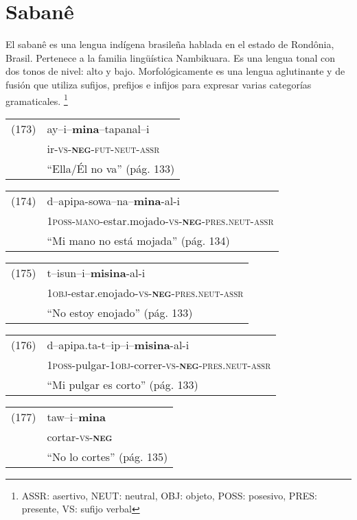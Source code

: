 \section*{Sabanê}

\noindent El sabanê es una lengua indígena brasileña hablada en el estado de Rondônia, Brasil. Pertenece a la familia lingüística Nambikuara. Es una lengua tonal con dos tonos de nivel: alto y bajo. Morfológicamente es una lengua aglutinante y de fusión que utiliza sufijos, prefijos e infijos para expresar varias categorías gramaticales.
\footnote{ASSR: asertivo, NEUT: neutral, OBJ: objeto, POSS: posesivo, PRES: presente, VS: sufijo verbal}
\vspace{0.5cm}

{\setmainfont{Charis SIL} 

\begin{tabular}{ll}
(173) & ay–i–\textbf{mina}–tapanal–i \\
& ir-\textsc{vs-\textbf{neg}-fut-neut-assr} \\
& ``Ella/Él no va'' (pág. 133)
\end{tabular} \vspace{0.5cm}

\begin{tabular}{ll}
(174) & d–apipa-sowa–na–\textbf{mina}-al-i \\
& \textsc{1poss-mano-}estar.mojado-\textsc{vs-\textbf{neg}-pres.neut-assr} \\
& ``Mi mano no está mojada'' (pág. 134)
\end{tabular} \vspace{0.5cm}

\begin{tabular}{ll}
(175) & t–isun–i–\textbf{misina}-al-i \\
& \textsc{1obj-}estar.enojado-\textsc{vs-\textbf{neg}-pres.neut-assr} \\
& ``No estoy enojado'' (pág. 133)
\end{tabular} \vspace{0.5cm}

\begin{tabular}{ll}
(176) & d–apipa.ta-t–ip–i–\textbf{misina}-al-i\\
& \textsc{1poss-}pulgar-\textsc{1obj-}correr-\textsc{vs-\textbf{neg}-pres.neut-assr} \\
& ``Mi pulgar es corto'' (pág. 133)
\end{tabular} \vspace{0.5cm}

\begin{tabular}{ll}
(177) & taw–i–\textbf{mina} \\
& cortar-\textsc{vs-\textbf{neg}} \\
& ``No lo cortes'' (pág. 135)
\end{tabular} \vspace{0.5cm}

}

